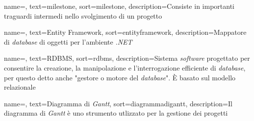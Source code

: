 {
    name=,
    text=milestone,
    sort=milestone,
    description={Consiste in importanti traguardi intermedi nello svolgimento di un progetto}
}

{
    name=,
    text=Entity Framework,
    sort=entityframework,
    description={Mappatore di \textit{database} di oggetti per l'ambiente \textit{.NET} \cite{siteK:docs-ef}}
}

{
    name=,
    text=RDBMS,
    sort=rdbms,
    description={Sistema \textit{software} progettato per consentire la creazione, la manipolazione e l'interrogazione efficiente di \textit{database}, per questo detto anche "gestore o motore del \textit{database}". È basato sul modello relazionale \cite{siteE:wiki}}
}

{
    name=,
    text=Diagramma di \textit{Gantt},
    sort=diagrammadigantt,
    description={Il diagramma di \textit{Gantt} è uno strumento utlizzato per la gestione dei progetti}
}